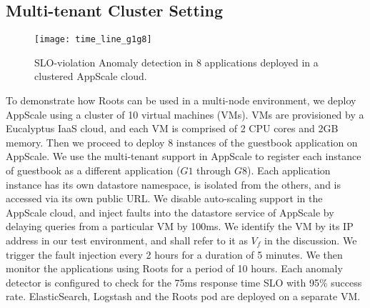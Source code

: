 
\subsection{Multi-tenant Cluster Setting}

\begin{figure}
\texttt{[image: time\_line\_g1g8]}
\caption{SLO-violation Anomaly detection in 8 applications deployed in
a clustered AppScale cloud.}
\label{fig:time_line_g1g8}
\end{figure}

To demonstrate how Roots can be used in a multi-node environment, we deploy AppScale
using a cluster of 10 virtual machines (VMs). VMs are provisioned by a
Eucalyptus IaaS
cloud, and each VM is comprised of 2 CPU cores and 2GB memory. Then we proceed
to deploy 8 instances of the guestbook application on AppScale. We use the multi-tenant support
in AppScale to register each instance of guestbook as a different application ($G1$ through $G8$). 
Each application instance has its own datastore namespace, is isolated from the others,
and is accessed via its own public URL. We disable auto-scaling support in 
the AppScale cloud, and inject faults into the datastore service of AppScale by delaying queries from a particular
VM by 100ms.
We identify the VM by its IP address
in our test environment, and shall refer to it as $V_f$ in the discussion. We trigger
the fault injection every 2 hours for a duration of 5 minutes. We then monitor
the applications using Roots for a period of 10 hours. Each anomaly detector is configured
to check for the 75ms response time SLO with 95\% success rate. 
ElasticSearch, Logstash and the Roots pod are deployed on a separate VM. 

